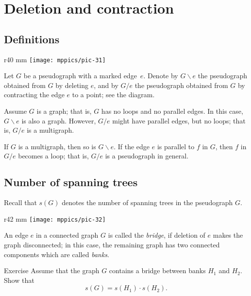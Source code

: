 \chapter{Deletion and contraction}
\label{Deletion and contraction}

\section*{Definitions}


\begin{wrapfigure}{r}{40 mm}
\vskip-12mm
\centering
\texttt{[image: mppics/pic-31]}
\vskip-0mm
\end{wrapfigure}

Let $G$ be a pseudograph with a marked edge~$e$.
Denote by $G\backslash e$ the pseudograph obtained from $G$ by deleting $e$,
and by $G/e$ the pseudograph obtained from $G$ by contracting the edge $e$ to a point; see the diagram.

Assume $G$ is a graph; that is, $G$ has no loops and no parallel edges.
In this case, $G\backslash e$ is also a graph.
However, $G/e$ might have parallel edges, but no loops; that is, $G/e$ is a multigraph.

If $G$ is a multigraph, then so is $G\backslash e$.
If the edge $e$ is parallel to $f$ in $G$, then $f$ in $G/e$ becomes a loop; that is, $G/e$ is a pseudograph in general.


\section*{Number of spanning trees}

Recall that $s(G)$ denotes the number of spanning trees in the pseudograph $G$.

{
\begin{wrapfigure}{r}{42 mm}
\vskip-4mm
\centering
\texttt{[image: mppics/pic-32]}
\vskip-0mm
\end{wrapfigure}

An edge $e$ in a connected graph $G$ is called the \emph{bridge}, if deletion of $e$ makes the graph disconnected;
in this case, the remaining graph has two connected components which are called {}\emph{banks}.


\begin{thm}{Exercise}
Assume that the graph $G$ contains a bridge between banks $H_1$ and $H_2$.
Show that
\[s(G)=s(H_1)\cdot s(H_2).\]
\end{thm}

}


